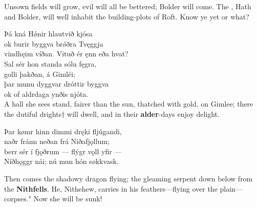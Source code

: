 \bvb Unsown fields will grow, evil will all be bettered; Bolder will come. The , Hath and Bolder, will well inhabit the building-plots of Roft. Know ye yet or what?

\bva Þá kná Hǿnir \hld hlautvið kjósa \\%
ok burir byggva \hld brǿðra Tvęggja \\%
vindhęim víðan. \hld Vituð ér ęnn eða hvat?\\%

\bva Sal sér hon standa \hld sólu fęgra, \\%
golli þakðan, \hld á Gimléi; \\%
þar munu dyggvar \hld dróttir byggva \\%
ok of aldrdaga \hld ynðis njóta.\\%

\bvb A hall she sees stand, fairer than the sun, thatched with gold, on Gimlee; there the dutiful drights† will dwell, and in their \textbf{alder}-days enjoy delight.

\bva Þar kømr hinn dimmi \hld dręki fljúgandi, \\%
naðr fránn neðan \hld frá Niðafjǫllum; \\%
berr sér í fjǫðrum \hld — flýgr vǫll yfir — \\%
Níðhǫggr nái; \hld nú mun hón søkkvask.

\bvb Then comes the shadowy dragon flying; the gleaming serpent down below from the \textbf{Nithfells}. He, Nithehew, carries in his feathers—flying over the plain—corpses." Now she will be sunk!\footnotemark[1]

